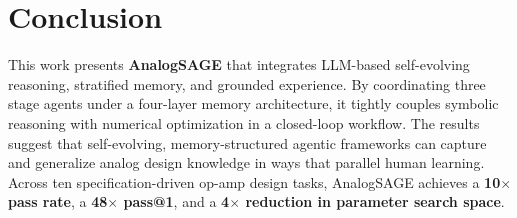 \documentclass[sigconf,nonacm]{acmart}
\begin{document}
\begin{table}[]
    \centering
    \caption{Comparison of normalized parameter search space across different configurations.}
    \label{tab:sizing_LLM}
\end{table}



\section{Conclusion}

This work presents \textbf{AnalogSAGE} that integrates LLM-based self-evolving reasoning, stratified memory, and grounded experience. By coordinating three stage agents under a four-layer memory architecture, it tightly couples symbolic reasoning with numerical optimization in a closed-loop workflow. The results suggest that self-evolving, memory-structured agentic frameworks can capture and generalize analog design knowledge in ways that parallel human learning.
Across ten specification-driven op-amp design tasks, AnalogSAGE achieves a \textbf{10$\times$ pass rate}, a \textbf{ 48$\times$ pass@1}, and a \textbf{4$\times$ reduction in parameter search space}.



\end{document}
